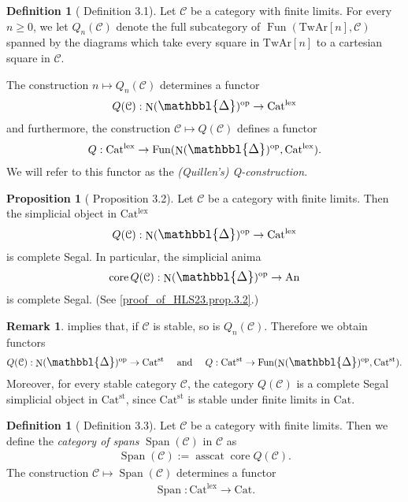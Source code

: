 \documentclass[a4paper,dvipdfmx,11pt,reqno]{amsart}
\DeclareMathOperator{\myop}{op}
\DeclareMathOperator{\N}{N}
\DeclareMathOperator{\Fun}{Fun}
\newcommand{\C}{\mathcal{C}}
\DeclareMathOperator{\core}{core}
\DeclareMathOperator{\asscat}{asscat}
\DeclareMathOperator{\Span}{Span}
\newcommand{\An}{\mathrm{An}}
\newcommand{\Cat}{\mathrm{Cat}}
\newcommand{\Catlex}{\mathrm{Cat^{lex}}}
\newcommand{\Catst}{\mathrm{Cat^{st}}}
\newcommand{\TwAr}{\mathrm{TwAr}}
\newcommand{\prism}{{\mathlarger{\mathbbl{\Delta}}}}
\theoremstyle{definition}
\newtheorem{definition}[theorem]{Definition}
\newtheorem{proposition}[theorem]{Proposition}
\newtheorem{remark}[theorem]{Remark}
\begin{document}
\begin{definition}[\cite{HLS23} Definition 3.1] \label{HLS23.def.3.1}
  Let $\C$ be a category with finite limits.
  For every $n \geq 0$, we let $Q_{n}(\C)$ denote the full subcategory of $\Fun(\TwAr[n],\C)$ spanned by the diagrams which take every square in $\TwAr[n]$ to a cartesian square in $\C$.

  The construction $n \mapsto Q_{n}(\C)$ determines a functor 
  \begin{align*}
    Q(\C) : \N(\prism)^{\myop} \to \Catlex
  \end{align*}
  and furthermore, the construction $\C \mapsto Q(\C)$ defines a functor 
  \begin{align*}
    Q : \Catlex \to \Fun(\N(\prism)^{\myop},\Catlex).
  \end{align*}
  We will refer to this functor as the \textit{(Quillen's) Q-construction}.
\end{definition}

\begin{proposition}[\cite{HLS23} Proposition 3.2] \label{HLS23.prop.3.2}
  Let $\C$ be a category with finite limits.
  Then the simplicial object in $\Catlex$
  \begin{align*}
    Q(\C) : \N(\prism)^{\myop} \to \Catlex
  \end{align*}
  is complete Segal.
  In particular, the simplicial anima 
  \begin{align*}
    \core Q(\C) : \N(\prism)^{\myop} \to \An
  \end{align*}
  is complete Segal.
  (See \cref{proof_of_HLS23.prop.3.2}.)
\end{proposition}

\begin{remark} \label{Ber.rem.4.32}
   implies that, if $\C$ is stable, so is $Q_n(\C)$.
  Therefore we obtain functors
  \begin{align*}
    Q(\C) : \N(\prism)^{\myop} \to \Catst 
    \quad \text{ and } \quad 
    Q : \Catst \to \Fun(\N(\prism)^{\myop},\Catst).
  \end{align*}
  Moreover, for every stable category $\C$, the category $Q(\C)$ is a complete Segal simplicial object in $\Catst$, since $\Catst$ is stable under finite limits in $\Cat$.
\end{remark}

\begin{definition}[\cite{HLS23} Definition 3.3] \label{HLS23.def.3.3}
  Let $\C$ be a category with finite limits.
  Then we define the \textit{category of spans} $\Span(\C)$ in $\C$ as 
  \begin{align*}
    \Span(\C) := \asscat \core Q(\C).
  \end{align*}
  The construction $\C \mapsto \Span(\C)$ determines a functor 
  \begin{align*}
    \Span : \Catlex \to \Cat.
  \end{align*}
\end{definition}
\end{document}
